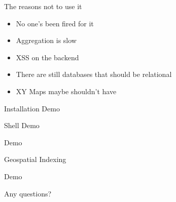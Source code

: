 \documentclass{beamer}
\begin{document}
\begin{frame}{The reasons not to use it}

\begin{itemize}
\item No one's been fired for it
\item Aggregation is slow
\item XSS on the backend
\item There are still databases that should be relational
\item XY Maps maybe shouldn't have
\end{itemize}

\end{frame}


\begin{frame}%

\begin{center}
   Installation Demo
\end{center}

\end{frame}


\begin{frame}%

\begin{center}
   Shell Demo
\end{center}

\end{frame}


\begin{frame}%

\begin{center}
   Demo
\end{center}

\end{frame}


\begin{frame}{Geospatial Indexing}
\end{frame}


\begin{frame}%

\begin{center}
   Demo
\end{center}

\end{frame}





\begin{frame} %

\begin{center}
   Any questions?
\end{center}

\end{frame}
\end{document}
